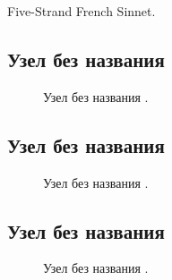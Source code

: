 
Five-Strand French Sinnet.

\addtocounter{KnotNoName}{1}

\subsection{Узел без названия }

\begin{figure}[H]\centering
	\begin{minipage}{1\linewidth}
		\begin{center}
			\tcbox[enhanced jigsaw,colframe=black,opacityframe=0.5,opacityback=0.5]
			{\centering{}}
		\end{center}
	\end{minipage}
\caption{Узел без названия .}
\label{ris:KnotNoName_1}
\end{figure}

\addtocounter{KnotNoName}{1}

\subsection{Узел без названия }

\begin{figure}[H]\centering
	\begin{minipage}{1\linewidth}
		\begin{center}
			\tcbox[enhanced jigsaw,colframe=black,opacityframe=0.5,opacityback=0.5]
			{\centering{}}
		\end{center}
	\end{minipage}
\caption{Узел без названия .}
\label{ris:KnotNoName_8}
\end{figure}

\addtocounter{KnotNoName}{1}

\subsection{Узел без названия }

\begin{figure}[H]\centering
	\begin{minipage}{1\linewidth}
		\begin{center}
			\tcbox[enhanced jigsaw,colframe=black,opacityframe=0.5,opacityback=0.5]
			{\centering{}}
		\end{center}
	\end{minipage}
\caption{Узел без названия .}
\label{ris:KnotNoName_2}
\end{figure}

